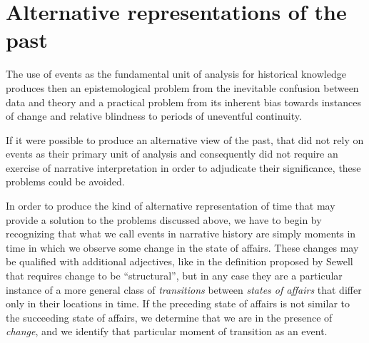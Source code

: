 \section*{Alternative representations of the past}
\label{sec:noevent}

The use of events as the fundamental unit of analysis for historical knowledge produces then an epistemological problem from the inevitable confusion between data and theory and a practical problem from its inherent bias towards instances of change and relative blindness to periods of uneventful continuity.

If it were possible to produce an alternative view of the past, that did not rely on events as their primary unit of analysis and consequently did not require an exercise of narrative interpretation in order to adjudicate their significance, these problems could be avoided.

In order to produce the kind of alternative representation of time that may provide a solution to the problems discussed above, we have to begin by recognizing that what we call events in narrative history are simply moments in time in which we observe some change in the state of affairs.
These changes may be qualified with additional adjectives, like in the definition proposed by Sewell that requires change to be ``structural'', but in any case they are a particular instance of a more general class of \emph{transitions} between \emph{states of affairs} that differ only in their locations in time.
If the preceding state of affairs is not similar to the succeeding state of affairs, we determine that we are in the presence of \emph{change}, and we identify that particular moment of transition as an event.

